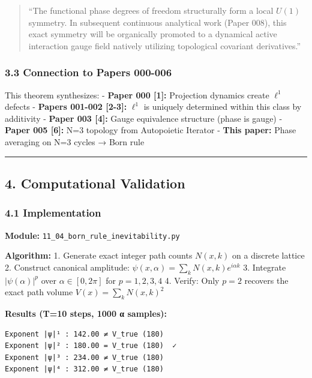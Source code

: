 \documentclass[
]{article}
\begin{document}
\begin{quote}
``The functional phase degrees of freedom structurally form a local
\(U(1)\) symmetry. In subsequent continuous analytical work (Paper 008),
this exact symmetry will be organically promoted to a dynamical active
interaction gauge field natively utilizing topological covariant
derivatives.''
\end{quote}

\subsubsection{3.3 Connection to Papers
000-006}\label{connection-to-papers-000-006}

This theorem synthesizes: - \textbf{Paper 000 {[}1{]}:} Projection
dynamics create \(\ell^1\) defects - \textbf{Papers 001-002 {[}2-3{]}:}
\(\ell^1\) is uniquely determined within this class by additivity -
\textbf{Paper 003 {[}4{]}:} Gauge equivalence structure (phase is gauge)
- \textbf{Paper 005 {[}6{]}:} N=3 topology from Autopoietic Iterator -
\textbf{This paper:} Phase averaging on N=3 cycles → Born rule

\begin{center}\rule{0.5\linewidth}{0.5pt}\end{center}

\subsection{4. Computational Validation}\label{computational-validation}

\subsubsection{4.1 Implementation}\label{implementation}

\textbf{Module:} \texttt{11\_04\_born\_rule\_inevitability.py}

\textbf{Algorithm:} 1. Generate exact integer path counts \(N(x,k)\) on
a discrete lattice 2. Construct canonical amplitude:
\(\psi(x, \alpha) = \sum_k N(x,k) e^{i\alpha k}\) 3. Integrate
\(|\psi(\alpha)|^p\) over \(\alpha \in [0, 2\pi]\) for \(p=1,2,3,4\) 4.
Verify: Only \(p=2\) recovers the exact path volume
\(V(x) = \sum_k N(x,k)^2\)

\textbf{Results (T=10 steps, 1000 α samples):}

\begin{verbatim}
Exponent |ψ|¹ : 142.00 ≠ V_true (180)
Exponent |ψ|² : 180.00 = V_true (180)  ✓
Exponent |ψ|³ : 234.00 ≠ V_true (180)
Exponent |ψ|⁴ : 312.00 ≠ V_true (180)
\end{verbatim}
\end{document}
